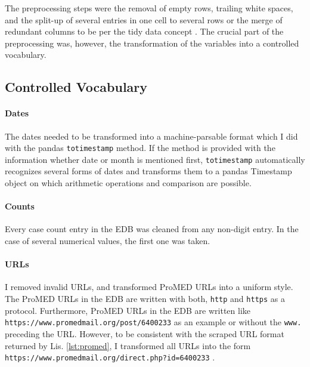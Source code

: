   The preprocessing steps were the removal of empty rows, trailing white spaces, and the split-up of several entries in one cell to several rows or the merge of redundant columns to be per the tidy data concept \citep{Wickham2014}.
  The crucial part of the preprocessing was, however, the transformation of the variables into a controlled vocabulary.

\subsection{Controlled Vocabulary}\label{controlled vocabulary}
  \paragraph{Dates}
    The dates needed to be transformed into a machine-parsable format which I did with the pandas \texttt{totimestamp} method.
    If the method is provided with the information whether date or month is mentioned first, \texttt{totimestamp} automatically recognizes several forms of dates and transforms them to a pandas Timestamp object on which arithmetic operations and comparison are possible.

  \paragraph{Counts}
    Every case count entry in the EDB was cleaned from any non-digit entry.
    In the case of several numerical values, the first one was taken.

  \paragraph{URLs}
    I removed invalid URLs, and transformed ProMED URLs into a uniform style. The ProMED URLs in the EDB are written with both, \texttt{http} and \texttt{https} as a protocol. Furthermore, ProMED URLs in the EDB are written like \textquotesingle \texttt{https://\allowbreak www.promedmail.org\allowbreak /post\allowbreak /6400233} \textquotesingle as an example or without the \texttt{www.} preceding the URL. However, to be consistent with the scraped URL format returned by Lis. \ref{lst:promed}, I transformed all URLs into the form \textquotesingle \texttt{https://\allowbreak www.promedmail.org/\allowbreak direct.php?id=6400233} \textquotesingle.

